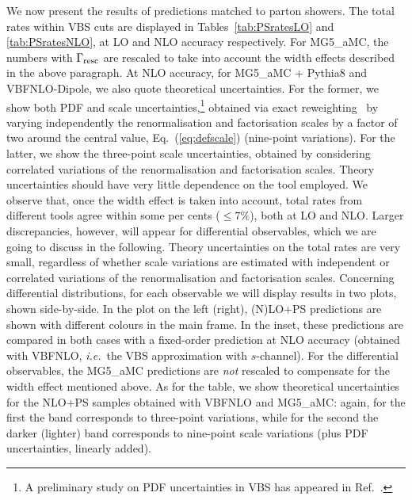 \documentclass[twocolumn,epjc3]{svjour3} %
\newlength{\width}
\begin{document}
We now present the results of predictions matched to parton showers.
The total rates within VBS cuts are displayed in Tables~\ref{tab:PSratesLO} and
\ref{tab:PSratesNLO}, at LO and NLO
accuracy respectively. For {\sc MG5\_aMC},
the numbers with $\Gamma_{\rm resc}$ are rescaled to
take into account the width effects described in the above paragraph. At NLO accuracy, for {\sc MG5\_aMC} + {\sc Pythia8} and {\sc VBFNLO}-{\sc Dipole}, we also quote
theoretical uncertainties.
For the former, we show both PDF and scale uncertainties,\footnote{A preliminary study on PDF uncertainties in VBS has appeared
in Ref.~\cite{Schwan:2017yy}.} obtained via exact reweighting~\cite{Frederix:2011ss} by varying independently the renormalisation and factorisation
scales by a factor of two around the central value, Eq.~(\ref{eq:defscale}) (nine-point variations).
For the latter, we show the
three-point scale uncertainties, obtained by considering correlated variations of the renormalisation and factorisation scales. Theory uncertainties should have very little dependence on the tool employed.
We observe that, once the width effect is taken into
account, total rates from different tools agree within some per cents ($\le7\%$), both at LO and NLO. Larger discrepancies, however, will appear for differential observables, which we are going to discuss in
the following. Theory uncertainties on the total rates are very small, regardless of whether scale variations are estimated with 
independent or correlated variations of the renormalisation and factorisation scales.
Concerning differential distributions, for each observable we will display results in two plots, shown side-by-side. In the plot on the left (right), (N)LO+PS predictions are shown
with different colours in the main frame. In the inset, these predictions are compared in both cases with a fixed-order prediction at NLO accuracy (obtained with
{\sc VBFNLO}, \emph{i.e.}\ the VBS approximation with $s$-channel).
For the differential observables, the {\sc MG5\_aMC} predictions are \emph{not} rescaled to compensate for the width effect mentioned above. As for the table, we show theoretical uncertainties for the NLO+PS samples
obtained with {\sc VBFNLO} and {\sc MG5\_aMC}:
again, for the first the band corresponds to three-point variations, while for the second the darker (lighter) band corresponds to nine-point
scale variations (plus PDF uncertainties, linearly added).
\end{document}
